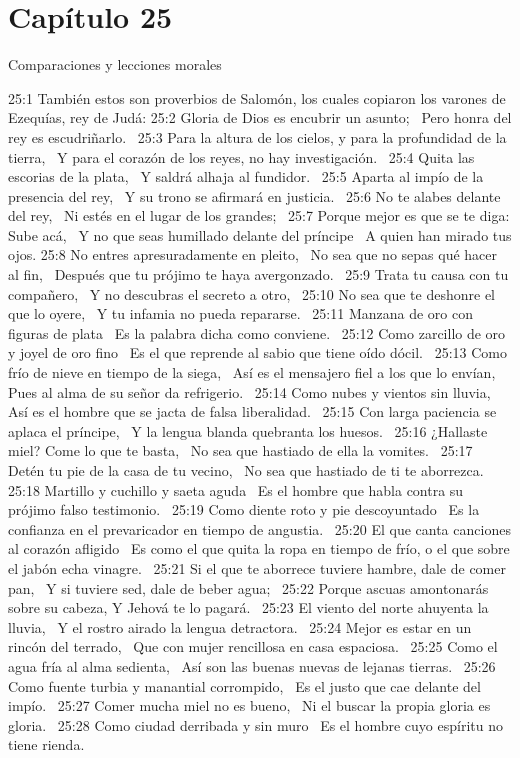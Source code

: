 \section*{Capítulo 25}
Comparaciones y lecciones morales  

25:1 También estos son proverbios de Salomón, los cuales copiaron los varones de Ezequías, rey de Judá: 
25:2 Gloria de Dios es encubrir un asunto;  
Pero honra del rey es escudriñarlo.  
25:3 Para la altura de los cielos, y para la profundidad de la tierra,  
Y para el corazón de los reyes, no hay investigación.  
25:4 Quita las escorias de la plata,  
Y saldrá alhaja al fundidor.  
25:5 Aparta al impío de la presencia del rey,  
Y su trono se afirmará en justicia.  
25:6 No te alabes delante del rey,  
Ni estés en el lugar de los grandes;  
25:7 Porque mejor es que se te diga: Sube acá,  
Y no que seas humillado delante del príncipe  
A quien han mirado tus ojos. 
25:8 No entres apresuradamente en pleito,  
No sea que no sepas qué hacer al fin,  
Después que tu prójimo te haya avergonzado.  
25:9 Trata tu causa con tu compañero,  
Y no descubras el secreto a otro,  
25:10 No sea que te deshonre el que lo oyere,  
Y tu infamia no pueda repararse.  
25:11 Manzana de oro con figuras de plata  
Es la palabra dicha como conviene.  
25:12 Como zarcillo de oro y joyel de oro fino  
Es el que reprende al sabio que tiene oído dócil.  
25:13 Como frío de nieve en tiempo de la siega,  
Así es el mensajero fiel a los que lo envían,  
Pues al alma de su señor da refrigerio.  
25:14 Como nubes y vientos sin lluvia,  
Así es el hombre que se jacta de falsa liberalidad.  
25:15 Con larga paciencia se aplaca el príncipe,  
Y la lengua blanda quebranta los huesos.  
25:16 ¿Hallaste miel? Come lo que te basta,  
No sea que hastiado de ella la vomites.  
25:17 Detén tu pie de la casa de tu vecino,  
No sea que hastiado de ti te aborrezca.  
25:18 Martillo y cuchillo y saeta aguda  
Es el hombre que habla contra su prójimo falso testimonio.  
25:19 Como diente roto y pie descoyuntado  
Es la confianza en el prevaricador en tiempo de angustia.  
25:20 El que canta canciones al corazón afligido  
Es como el que quita la ropa en tiempo de frío, o el que sobre el jabón echa vinagre.  
25:21 Si el que te aborrece tuviere hambre, dale de comer pan,  
Y si tuviere sed, dale de beber agua;  
25:22 Porque ascuas amontonarás sobre su cabeza, 
Y Jehová te lo pagará.  
25:23 El viento del norte ahuyenta la lluvia,  
Y el rostro airado la lengua detractora.  
25:24 Mejor es estar en un rincón del terrado,  
Que con mujer rencillosa en casa espaciosa.  
25:25 Como el agua fría al alma sedienta,  
Así son las buenas nuevas de lejanas tierras.  
25:26 Como fuente turbia y manantial corrompido,  
Es el justo que cae delante del impío.  
25:27 Comer mucha miel no es bueno,  
Ni el buscar la propia gloria es gloria.  
25:28 Como ciudad derribada y sin muro  
Es el hombre cuyo espíritu no tiene rienda.  
